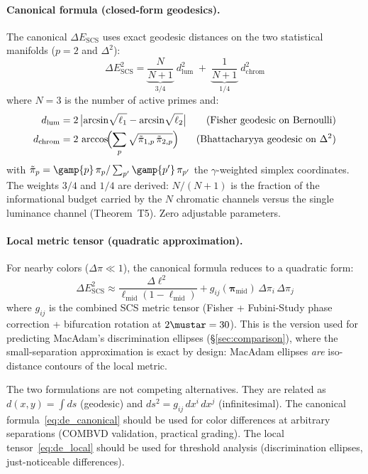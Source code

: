 \documentclass[12pt,a4paper]{article}
\begin{document}
\paragraph{Canonical formula (closed-form geodesics).}
The canonical $\Delta E_{\mathrm{SCS}}$ uses exact geodesic distances
on the two statistical manifolds ($p=2$ and $\Delta^2$):
\begin{equation}
\Delta E_{\mathrm{SCS}}^2 =
  \underbrace{\frac{N}{N+1}}_{3/4}\; d_{\mathrm{lum}}^2 \;+\;
  \underbrace{\frac{1}{N+1}}_{1/4}\; d_{\mathrm{chrom}}^2
\label{eq:de_canonical}
\end{equation}
where $N = 3$ is the number of active primes and:
\begin{align}
  d_{\mathrm{lum}} &= 2\,\bigl|\arcsin\!\sqrt{\ell_1}
    - \arcsin\!\sqrt{\ell_2}\bigr|
    & \text{(Fisher geodesic on Bernoulli)} \\
  d_{\mathrm{chrom}} &= 2\,\arccos\!\Bigl(
    \sum_{p} \sqrt{\tilde{\pi}_{1,p}\,\tilde{\pi}_{2,p}}\Bigr)
    & \text{(Bhattacharyya geodesic on $\Delta^2$)}
\end{align}
with $\tilde{\pi}_p = \gamp{p}\,\pi_p / \sum_{p'}\gamp{p'}\,\pi_{p'}$
the $\gamma$-weighted simplex coordinates. The weights $3/4$ and $1/4$
are derived: $N/(N+1)$ is the fraction of the informational budget
carried by the $N$ chromatic channels versus the single luminance
channel (Theorem~T5). Zero adjustable parameters.

\paragraph{Local metric tensor (quadratic approximation).}
For nearby colors ($\Delta\pi \ll 1$), the canonical formula reduces
to a quadratic form:
\begin{equation}
\Delta E_{\mathrm{SCS}}^2 \approx
  \frac{\Delta\ell^2}{\ell_{\mathrm{mid}}(1-\ell_{\mathrm{mid}})}
  + g_{ij}(\bm{\pi}_{\mathrm{mid}}) \, \Delta\pi_i \, \Delta\pi_j
\label{eq:de_local}
\end{equation}
where $g_{ij}$ is the combined SCS metric tensor (Fisher +
Fubini-Study phase correction + bifurcation rotation at $2\mustar =
30$). This is the version used for predicting MacAdam's discrimination
ellipses (\S\ref{sec:comparison}), where the small-separation
approximation is exact by design: MacAdam ellipses \emph{are}
iso-distance contours of the local metric.

\begin{remark}
The two formulations are not competing alternatives. They are related
as $d(x,y) = \int ds$ (geodesic) and $ds^2 = g_{ij}\,dx^i\,dx^j$
(infinitesimal). The canonical formula~\eqref{eq:de_canonical} should
be used for color differences at arbitrary separations (COMBVD
validation, practical grading). The local
tensor~\eqref{eq:de_local} should be used for threshold analysis
(discrimination ellipses, just-noticeable differences).
\end{remark}
\end{document}
